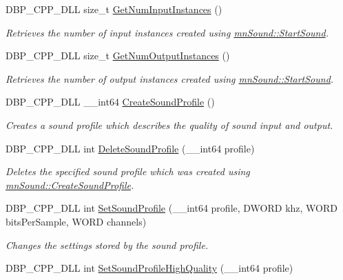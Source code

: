 \begin{DoxyCompactItemize}
DBP\_\-CPP\_\-DLL size\_\-t \hyperlink{namespacemn_sound_a2fa79bfe96c3fbd8e35f87b3252bccbb}{GetNumInputInstances} ()
\begin{DoxyCompactList}\small\item\em Retrieves the number of input instances created using \hyperlink{namespacemn_sound_aca60b744a68a7f44ef38232112c992e4}{mnSound::StartSound}. \item\end{DoxyCompactList}\item 
DBP\_\-CPP\_\-DLL size\_\-t \hyperlink{namespacemn_sound_a9aaa075dc47b75022c3153780dfd2f06}{GetNumOutputInstances} ()
\begin{DoxyCompactList}\small\item\em Retrieves the number of output instances created using \hyperlink{namespacemn_sound_aca60b744a68a7f44ef38232112c992e4}{mnSound::StartSound}. \item\end{DoxyCompactList}\item 
DBP\_\-CPP\_\-DLL \_\-\_\-int64 \hyperlink{namespacemn_sound_aa4d8320727776b4fc6ba743246ac0da3}{CreateSoundProfile} ()
\begin{DoxyCompactList}\small\item\em Creates a sound profile which describes the quality of sound input and output. \item\end{DoxyCompactList}\item 
DBP\_\-CPP\_\-DLL int \hyperlink{namespacemn_sound_a13ead4204e8aac216c6ce7fbd527a760}{DeleteSoundProfile} (\_\-\_\-int64 profile)
\begin{DoxyCompactList}\small\item\em Deletes the specified sound profile which was created using \hyperlink{namespacemn_sound_aa4d8320727776b4fc6ba743246ac0da3}{mnSound::CreateSoundProfile}. \item\end{DoxyCompactList}\item 
DBP\_\-CPP\_\-DLL int \hyperlink{namespacemn_sound_acd691f2743b6916bae1167a0d0039a2f}{SetSoundProfile} (\_\-\_\-int64 profile, DWORD khz, WORD bitsPerSample, WORD channels)
\begin{DoxyCompactList}\small\item\em Changes the settings stored by the sound profile. \item\end{DoxyCompactList}\item 
DBP\_\-CPP\_\-DLL int \hyperlink{namespacemn_sound_a69d99c45fccdd7cf314ee3ad3b1680a4}{SetSoundProfileHighQuality} (\_\-\_\-int64 profile)

\end{DoxyCompactItemize}
